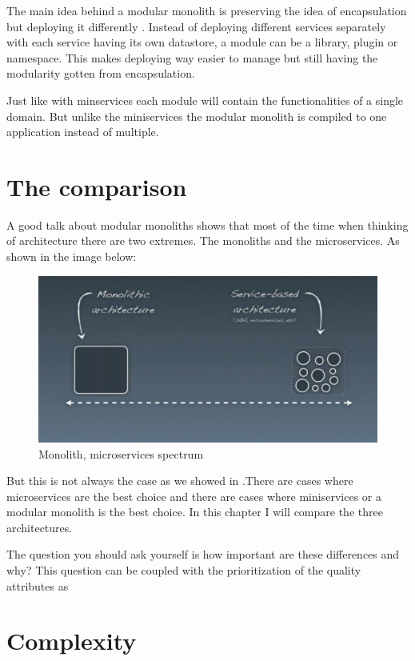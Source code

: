 The main idea behind a modular monolith is preserving the idea of encapsulation but deploying it differently \cite{modularMonolithIdea}. Instead of deploying different services separately with each service having its own datastore, a module can be a library, plugin or namespace. This makes deploying way easier to manage but still having the modularity gotten from encapsulation. 

Just like with minservices each module will contain the functionalities of a single domain. But unlike the miniservices the modular monolith is compiled to one application instead of multiple.

\section{The comparison}
\label{sec:Comparison}

A good talk about modular monoliths \cite{modularMonolithTalk} shows that most of the time when thinking of architecture there are two extremes. The monoliths and the microservices. As shown in the image below:
\begin{figure}[H]
	\includegraphics[width=\linewidth]{microservices-spectrum.png}
	\caption{Monolith, microservices spectrum \cite{modularMonolithTalk}}
\end{figure}

But this is not always the case as we showed in .There are cases where microservices are the best choice and there are cases where miniservices or a modular monolith is the best choice. In this chapter I will compare the three architectures.

The question you should ask yourself is how important are these differences and why? This question can be coupled with the prioritization of the quality attributes as 

\section{Complexity}
\label{sec:Complexity}

